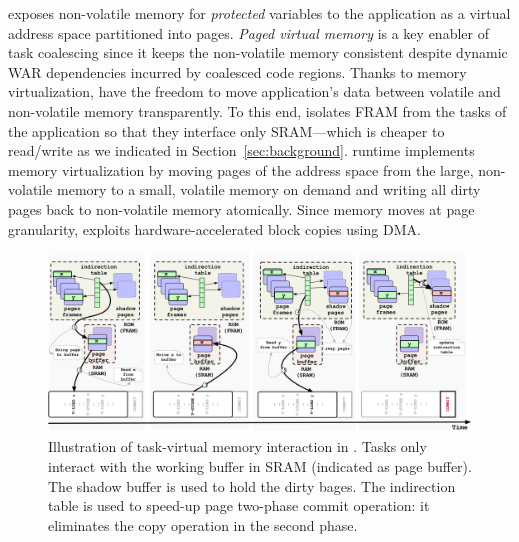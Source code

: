 \sys exposes non-volatile memory for \emph{protected} variables to
the application as a virtual address space partitioned into pages.
\emph{Paged virtual memory} is a key enabler of task coalescing since it keeps the non-volatile memory consistent despite dynamic WAR dependencies incurred by coalesced code regions. Thanks to memory virtualization, \sys have the freedom to move application's data between volatile and non-volatile memory transparently.
%
%
To this end, \sys isolates FRAM from the tasks of the application so that they interface only SRAM---which is cheaper to read/write as we indicated in Section~\ref{sec:background}.
%
\sys runtime implements memory
virtualization by moving pages of the address space from the large,
non-volatile memory to a small, volatile memory on demand and writing all dirty
pages back to non-volatile memory atomically. Since memory moves at page granularity, \sys
exploits hardware\hyp{}accelerated block copies using DMA.


\begin{figure}
	\centering
	\includegraphics[width=\textwidth]{figures/graffle/paging.pdf}
	\caption{Illustration of task-virtual memory interaction in \sys. Tasks only interact with the working buffer in SRAM (indicated as page buffer). The shadow buffer is used to hold the dirty bages. The indirection table is used to speed-up page two-phase commit operation: it eliminates the copy operation in the second phase.}
	\label{figure:coala_page_tags}
\end{figure}

